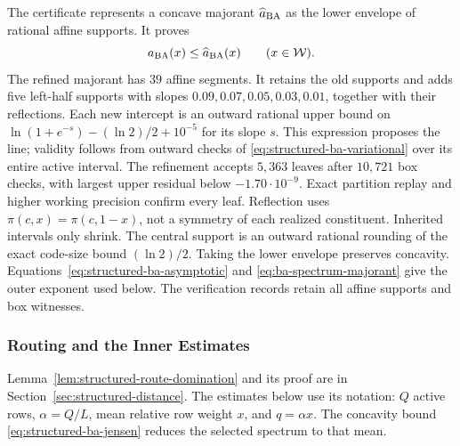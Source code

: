 The certificate represents a concave majorant $\widehat a_{\rm BA}$ as the
lower envelope of rational affine supports. It proves
\begin{equation}
  a_{\rm BA}(x)\le\widehat a_{\rm BA}(x)
  \qquad(x\in\mathcal W).
  \label{eq:ba-spectrum-majorant}
\end{equation}
The refined majorant has $39$ affine segments. It retains the old supports
and adds five left-half supports with slopes $0.09,0.07,0.05,0.03,0.01$,
together with their reflections. Each new intercept is an outward rational
upper bound on $\ln(1+e^{-s})-(\ln2)/2+10^{-5}$ for its slope $s$.
This expression proposes the line; validity follows from outward checks of
\eqref{eq:structured-ba-variational} over its entire active interval.
The refinement accepts $5{,}363$ leaves after $10{,}721$ box checks, with
largest upper residual below $-1.70\cdot10^{-9}$. Exact partition replay
and higher working precision confirm every leaf. Reflection uses
$\pi(c,x)=\pi(c,1-x)$, not a symmetry of each realized constituent.
Inherited intervals only shrink. The central support is an outward rational
rounding of the exact code-size bound $(\ln2)/2$. Taking the lower envelope
preserves concavity.
Equations~\eqref{eq:structured-ba-asymptotic} and
\eqref{eq:ba-spectrum-majorant} give the outer exponent used below. The
verification records retain all affine supports and box witnesses.

\subsubsection{Routing and the Inner Estimates}

Lemma~\ref{lem:structured-route-domination} and its proof are in
Section~\ref{sec:structured-distance}. The estimates below use its notation:
$Q$ active rows, $\alpha=Q/L$, mean relative row weight $x$, and
$q=\alpha x$. The concavity bound
\eqref{eq:structured-ba-jensen} reduces the selected spectrum to that mean.


